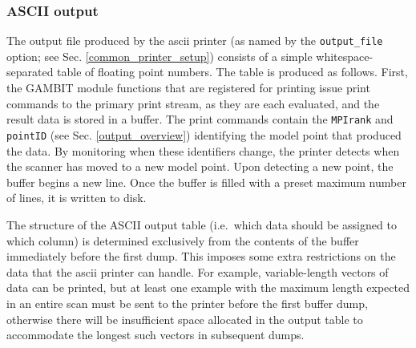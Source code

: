 \documentclass[pdftex,twocolumn,epjc3_preprint,runningheads]{svjour3}
\renewcommand{\_}{\discretionary{\underscore}{}{\underscore}}
\newcommand\cpp[1]{{\lstinline!#1!}}  %
\newcommand\yaml[1]{{\lstset{style=yaml}\lstinline!#1!\lstset{style=cpp}}}
\newcommand{\gambit}{\textsf{GAMBIT}\xspace}
\newcommand{\GB}{\gambit}
\begin{document}
\subsubsection{ASCII output}
\label{ascii_output}
The output file produced by the \textsf{ascii} printer (as named by the \yaml{output_file} option; see Sec. \ref{common_printer_setup}) consists of a simple whitespace-separated table of floating point numbers. The table is produced as follows. First, the \GB module functions that are registered for printing issue print commands to the primary print stream, as they are each evaluated, and the result data is stored in a buffer. The print commands contain the \cpp{MPIrank} and \cpp{pointID} (see Sec. \ref{output_overview}) identifying the model point that produced the data.  By monitoring when these identifiers change, the printer detects when the scanner has moved to a new model point. Upon detecting a new point, the buffer begins a new line. Once the buffer is filled with a preset maximum number of lines, it is written to disk.

The structure of the ASCII output table (i.e.\ which data should be assigned to which column) is determined exclusively from the contents of the buffer immediately before the first dump.  This imposes some extra restrictions on the data that the \textsf{ascii} printer can handle. For example, variable-length vectors of data can be printed, but at least one example with the maximum length expected in an entire scan must be sent to the printer before the first buffer dump, otherwise there will be insufficient space allocated in the output table to accommodate the longest such vectors in subsequent dumps.
\end{document}
